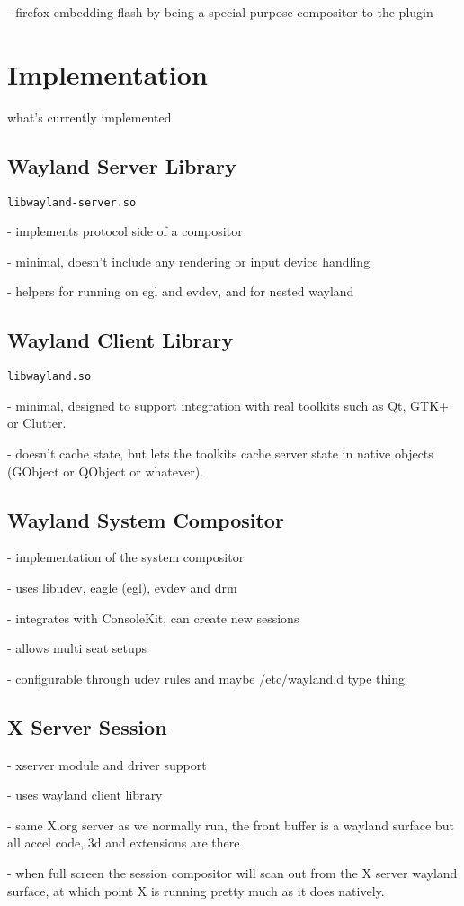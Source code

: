 \documentclass{article}
\begin{document}
 - firefox embedding flash by being a special purpose compositor to
   the plugin

\section{Implementation}

what's currently implemented

\subsection{Wayland Server Library}

\texttt{libwayland-server.so}

 - implements protocol side of a compositor

 - minimal, doesn't include any rendering or input device handling

 - helpers for running on egl and evdev, and for nested wayland

\subsection{Wayland Client Library}

\texttt{libwayland.so}

 - minimal, designed to support integration with real toolkits such as
   Qt, GTK+ or Clutter.

 - doesn't cache state, but lets the toolkits cache server state in
   native objects (GObject or QObject or whatever).

\subsection{Wayland System Compositor}

 - implementation of the system compositor

 - uses libudev, eagle (egl), evdev and drm

 - integrates with ConsoleKit, can create new sessions

 - allows multi seat setups

 - configurable through udev rules and maybe /etc/wayland.d type thing

\subsection{X Server Session}

 - xserver module and driver support

 - uses wayland client library

 - same X.org server as we normally run, the front buffer is a wayland
   surface but all accel code, 3d and extensions are there

 - when full screen the session compositor will scan out from the X
   server wayland surface, at which point X is running pretty much as it
   does natively.
\end{document}

